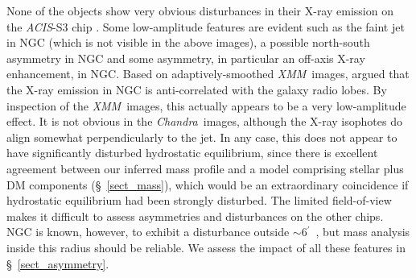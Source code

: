 \documentclass{emulateapj}
\def \arcmin {\hbox{$^\prime$}}
\newcommand{\chandra }{{\em Chandra}}
\newcommand{\acis }{{\em ACIS}}
\newcommand{\xmm }{{\em XMM}}
\newcommand{\thin}{\thinspace}
\begin{document}
None of the objects show very obvious disturbances in their X-ray emission
on the \acis-S3 chip \citep[such as those found in NGC\thin 4636:][]{jones02a}.
Some low-amplitude features are evident such as the faint
jet in NGC\thin 4261 (which is not visible in the above images),
a possible north-south asymmetry in NGC\thin 1407 and some asymmetry,  in particular
an off-axis X-ray enhancement, in NGC\thin 4125. Based on adaptively-smoothed
\xmm\ images, \citet{croston05a} argued that the X-ray emission in 
NGC\thin 4261 is anti-correlated with the galaxy radio lobes.
By inspection of the \xmm\ images, this actually appears to be a very 
low-amplitude effect. It is not obvious in the 
\chandra\ images, although the X-ray isophotes do align somewhat perpendicularly
to the jet. 
In any case, this does not appear to have significantly disturbed
hydrostatic equilibrium, since there is excellent agreement between our 
inferred mass profile and a model comprising stellar plus DM components
(\S~\ref{sect_mass}), which would be an extraordinary coincidence
if hydrostatic equilibrium had been strongly disturbed. 
The limited field-of-view makes it difficult to assess asymmetries and
disturbances on the other chips. NGC\thin 4472 is known, however,
to exhibit a disturbance outside $\sim$6\arcmin\ \citep{irwin96}, but 
mass analysis inside this radius should be reliable. We assess the impact
of all these features in \S~\ref{sect_asymmetry}.
\end{document}
